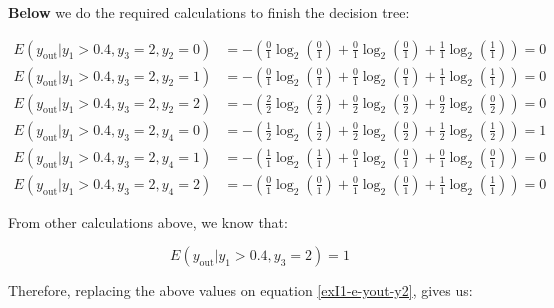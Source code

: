 \documentclass[12pt]{article}
\begin{document}
\begin{enumerate}[leftmargin=\labelsep]
        \textbf{Below} we do the required calculations to finish the decision tree:

        \[
          \begin{aligned}
            E(y_{\text{out}} | y_1 > 0.4 , y_3 = 2 , y_2 = 0) & = - \left(\frac{0}{1} \log_2\left(\frac{0}{1}\right) + \frac{0}{1} \log_2\left(\frac{0}{1}\right)
            + \frac{1}{1} \log_2\left(\frac{1}{1}\right)\right) = 0                                                                                               \\
            E(y_{\text{out}} | y_1 > 0.4 , y_3 = 2 , y_2 = 1) & = - \left(\frac{0}{1} \log_2\left(\frac{0}{1}\right) + \frac{0}{1} \log_2\left(\frac{0}{1}\right)
            + \frac{1}{1} \log_2\left(\frac{1}{1}\right)\right) = 0                                                                                               \\
            E(y_{\text{out}} | y_1 > 0.4 , y_3 = 2 , y_2 = 2) & = - \left(\frac{2}{2} \log_2\left(\frac{2}{2}\right) + \frac{0}{2} \log_2\left(\frac{0}{2}\right)
            + \frac{0}{2} \log_2\left(\frac{0}{2}\right)\right) = 0                                                                                               \\
            E(y_{\text{out}} | y_1 > 0.4 , y_3 = 2 , y_4 = 0) & = - \left(\frac{1}{2} \log_2\left(\frac{1}{2}\right) + \frac{0}{2} \log_2\left(\frac{0}{2}\right)
            + \frac{1}{2} \log_2\left(\frac{1}{2}\right)\right) = 1                                                                                               \\
            E(y_{\text{out}} | y_1 > 0.4 , y_3 = 2 , y_4 = 1) & = - \left(\frac{1}{1} \log_2\left(\frac{1}{1}\right) + \frac{0}{1} \log_2\left(\frac{0}{1}\right)
            + \frac{0}{1} \log_2\left(\frac{0}{1}\right)\right) = 0                                                                                               \\
            E(y_{\text{out}} | y_1 > 0.4 , y_3 = 2 , y_4 = 2) & = - \left(\frac{0}{1} \log_2\left(\frac{0}{1}\right) + \frac{0}{1} \log_2\left(\frac{0}{1}\right)
            + \frac{1}{1} \log_2\left(\frac{1}{1}\right)\right) = 0
          \end{aligned}
        \]

        From other calculations above, we know that:

        \[
          E(y_{\text{out}} | y_1 > 0.4 , y_3 = 2) = 1
        \]

        Therefore, replacing the above values on equation \eqref{exI1-e-yout-y2}, gives us:


\end{enumerate}
\end{document}
